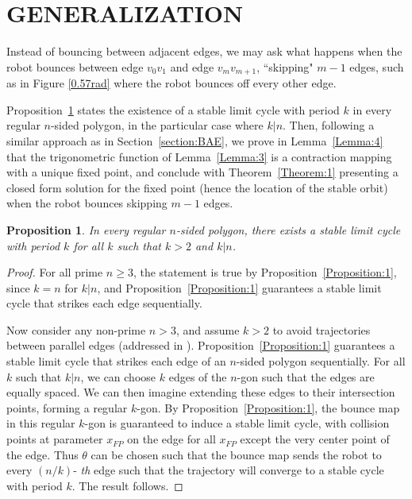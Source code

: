 \documentclass[letterpaper, 10 pt, conference]{ieeeconf}  %
\newtheorem{proposition}[theorem]{\bf Proposition}
\begin{document}
\section{GENERALIZATION}
\label{general}

Instead of bouncing between adjacent edges, we may ask what happens 
when the robot bounces between edge $v_0 v_1$ and edge $v_m v_{m+1}$, 
``skipping" $m-1$ edges, such as in Figure \ref{0.57rad} where the robot bounces off 
every other edge.

Proposition~\ref{Proposition:2} states the existence of a stable limit cycle
with period $k$ in every regular $n$-sided polygon, in the particular case where
$k|n$. Then, following a similar approach as in Section~\ref{section:BAE}, we
prove in Lemma~\ref{Lemma:4} that the trigonometric function of
Lemma~\ref{Lemma:3} is a contraction mapping with a unique fixed point, and
conclude with Theorem~\ref{Theorem:1} presenting a closed form solution for the
fixed point (hence the location of the stable orbit) when the robot bounces
skipping $m-1$ edges.

\begin{proposition} \label{Proposition:2}
In every regular $n$-sided polygon, there
exists a stable limit cycle with period $k$ for all $k$ such that
$k > 2$ and $k|n$.
\end{proposition}
\begin{proof}
For all prime $n\geq3$, the statement
is true by Proposition~\ref{Proposition:1}, since $k=n$ for $k|n$, 
and Proposition~\ref{Proposition:1} guarantees a stable limit 
cycle that strikes each edge sequentially.

Now consider any non-prime $n>3$, and assume $k>2$ to avoid
trajectories between parallel edges (addressed in \cite{bounce}).
Proposition~\ref{Proposition:1} guarantees a stable limit cycle that strikes each
edge of an $n$-sided polygon sequentially. For all $k$ such that
$k|n$, we can choose $k$ edges of the $n$-gon such that the
edges are equally spaced. We can then imagine extending
these edges to their intersection points, forming a regular $k$-gon. 
By Proposition~\ref{Proposition:1}, the bounce map in this regular $k$-gon
is guaranteed to induce a stable limit cycle, with collision
points at parameter $x_{FP}$ on the edge for all $x_{FP}$ except the very
center point of the edge. Thus $\theta$ can be chosen such that the
bounce map sends the robot to every $(n/k)$- \textit{th} edge such
that the trajectory will converge to a stable cycle with period
$k$. The result follows.
\end{proof}
\end{document}
